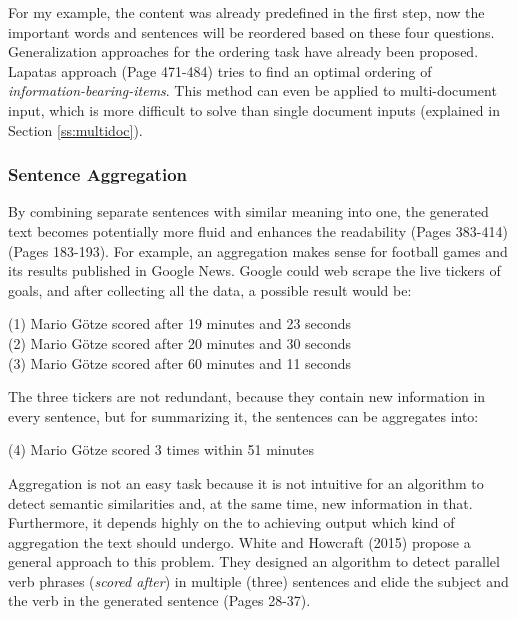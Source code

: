 For my example, the content was already predefined in the first step, now the important words and sentences will be reordered based on these four questions. Generalization approaches for the ordering task have already been proposed. Lapatas approach \cite{lapata} (Page 471-484) tries to find an optimal ordering of \textit{information-bearing-items}. This method can even be applied to multi-document input, which is more difficult to solve than single document inputs (explained in Section \ref{ss:multidoc}).

\subsubsection{Sentence Aggregation}

By combining separate sentences with similar meaning into one, the generated text becomes potentially more fluid and enhances the readability \cite{dal} (Pages 383-414) \cite{cheng-mellish2000} (Pages 183-193). For example, an aggregation makes sense for football games and its results published in Google News. Google could web scrape the live tickers of goals, and after collecting all the data, a possible result would be:

\begin{tcolorbox}
	\begin{center}
		(1) Mario Götze scored after 19 minutes and 23 seconds \\
		(2) Mario Götze scored after 20 minutes and 30 seconds \\
		(3) Mario Götze scored after 60 minutes and 11 seconds
	\end{center}
\end{tcolorbox}

The three tickers are not redundant, because they contain new information in every sentence, but for summarizing it, the sentences can be aggregates into:

\begin{tcolorbox}
	\begin{center}
		(4) Mario Götze scored 3 times within 51 minutes
	\end{center}
\end{tcolorbox}

Aggregation is not an easy task because it is not intuitive for an algorithm to detect semantic similarities and, at the same time, new information in that. Furthermore, it depends highly on the to achieving output which kind of aggregation the text should undergo. White and Howcraft (2015) propose a general approach to this problem. They designed an algorithm to detect parallel verb phrases (\textit{scored after}) in multiple (three) sentences and elide the subject and the verb in the generated sentence \cite{white-howcroft-2015-inducing} (Pages 28-37). 


